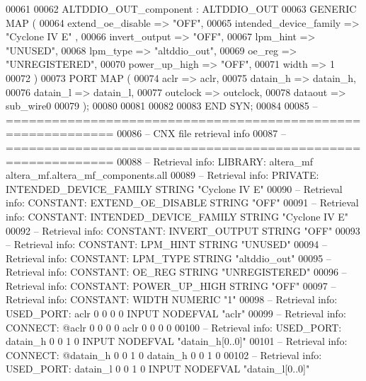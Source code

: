 \begin{DoxyCode}
{00061 
00062     ALTDDIO\_OUT\_component : ALTDDIO\_OUT
00063     \textcolor{keywordflow}{GENERIC} \textcolor{keywordflow}{MAP} (
00064         extend\_oe\_disable => \textcolor{keyword}{"OFF"},
00065         intended\_device\_family => \textcolor{keyword}{"Cyclone IV E"}  ,
00066         invert\_output => \textcolor{keyword}{"OFF"},
00067         lpm\_hint => \textcolor{keyword}{"UNUSED"},
00068         lpm\_type => \textcolor{keyword}{"altddio\_out"},
00069         oe\_reg => \textcolor{keyword}{"UNREGISTERED"},
00070         power\_up\_high => \textcolor{keyword}{"OFF"},
00071         width => \textcolor{vhdllogic}{1}
00072     \textcolor{vhdlchar}{)}
00073     \textcolor{keywordflow}{PORT} \textcolor{keywordflow}{MAP} (
00074         aclr => aclr,
00075         datain\_h => datain_h,
00076         datain\_l => datain_l,
00077         outclock => outclock,
00078         dataout => sub_wire0
00079     \textcolor{vhdlchar}{)};
00080 
00081 
00082 
00083 \textcolor{keywordflow}{END} \textcolor{vhdlchar}{SYN};
00084 
00085 \textcolor{keyword}{-- ============================================================}
00086 \textcolor{keyword}{-- CNX file retrieval info}
00087 \textcolor{keyword}{-- ============================================================}
00088 \textcolor{keyword}{-- Retrieval info: LIBRARY: altera\_mf altera\_mf.altera\_mf\_components.all}
00089 \textcolor{keyword}{-- Retrieval info: PRIVATE: INTENDED\_DEVICE\_FAMILY STRING "Cyclone IV E"}
00090 \textcolor{keyword}{-- Retrieval info: CONSTANT: EXTEND\_OE\_DISABLE STRING "OFF"}
00091 \textcolor{keyword}{-- Retrieval info: CONSTANT: INTENDED\_DEVICE\_FAMILY STRING "Cyclone IV E"}
00092 \textcolor{keyword}{-- Retrieval info: CONSTANT: INVERT\_OUTPUT STRING "OFF"}
00093 \textcolor{keyword}{-- Retrieval info: CONSTANT: LPM\_HINT STRING "UNUSED"}
00094 \textcolor{keyword}{-- Retrieval info: CONSTANT: LPM\_TYPE STRING "altddio\_out"}
00095 \textcolor{keyword}{-- Retrieval info: CONSTANT: OE\_REG STRING "UNREGISTERED"}
00096 \textcolor{keyword}{-- Retrieval info: CONSTANT: POWER\_UP\_HIGH STRING "OFF"}
00097 \textcolor{keyword}{-- Retrieval info: CONSTANT: WIDTH NUMERIC "1"}
00098 \textcolor{keyword}{-- Retrieval info: USED\_PORT: aclr 0 0 0 0 INPUT NODEFVAL "aclr"}
00099 \textcolor{keyword}{-- Retrieval info: CONNECT: @aclr 0 0 0 0 aclr 0 0 0 0}
00100 \textcolor{keyword}{-- Retrieval info: USED\_PORT: datain\_h 0 0 1 0 INPUT NODEFVAL "datain\_h[0..0]"}
00101 \textcolor{keyword}{-- Retrieval info: CONNECT: @datain\_h 0 0 1 0 datain\_h 0 0 1 0}
00102 \textcolor{keyword}{-- Retrieval info: USED\_PORT: datain\_l 0 0 1 0 INPUT NODEFVAL "datain\_l[0..0]"}
}
\end{DoxyCode}
